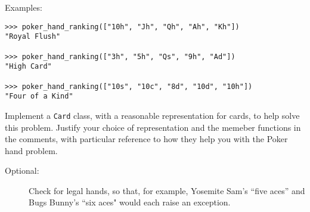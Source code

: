 \documentclass{article}
\begin{document}
\begin{enumerate}
Examples:
\begin{lstlisting}
>>> poker_hand_ranking(["10h", "Jh", "Qh", "Ah", "Kh"]) 
"Royal Flush"

>>> poker_hand_ranking(["3h", "5h", "Qs", "9h", "Ad"]) 
"High Card"

>>> poker_hand_ranking(["10s", "10c", "8d", "10d", "10h"]) 
"Four of a Kind"
\end{lstlisting}

Implement a {\tt Card} class, with a reasonable representation for
cards, to help solve this problem.  Justify your choice of representation
and the memeber functions
in the comments, with particular reference to how they help you with
the Poker hand problem.

\begin{description}
\item[Optional:] Check for legal hands, so that, for example,
Yosemite Sam's ``five aces'' and Bugs Bunny's ``six aces" would each
 raise an exception.
\end{description}
\end{enumerate}
\end{document}
